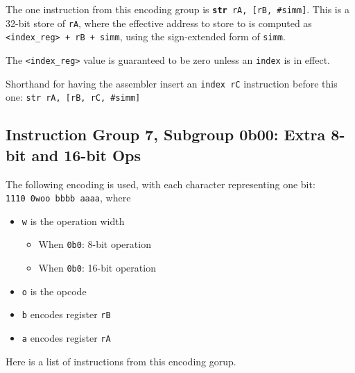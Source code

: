 \documentclass{article}
\begin{document}
	The one instruction from this encoding group is
	\texttt{\textbf{str} rA, [rB, \#simm]}.
	This is a 32-bit store of \texttt{rA}, where the effective address to
	store to is computed as \texttt{<index\_reg> + rB + simm}, using the
	sign-extended form of \texttt{simm}.

	The \texttt{<index\_reg>} value is guaranteed to be zero unless an
	\texttt{index} is in effect.

	Shorthand for having the assembler insert an \texttt{index rC}
	instruction before this one: \texttt{str rA, [rB, rC, \#simm]}


	\doublespacing

	\subsection{Instruction Group 7, Subgroup 0b00:
		Extra 8-bit and 16-bit Ops}
	The following encoding is used, with each character representing one
	bit: \\
	\texttt{1110 0woo bbbb aaaa}, where

	\singlespacing
	\begin{itemize}
	\item \texttt{w} is the operation width
		\begin{itemize}
		\item When \texttt{0b0}:
			8-bit operation
		\item When \texttt{0b0}:
			16-bit operation
		\end{itemize}
	\item \texttt{o} is the opcode
	\item \texttt{b} encodes register \texttt{rB}
	\item \texttt{a} encodes register \texttt{rA}
	\end{itemize}
	\doublespacing

	Here is a list of instructions from this encoding gorup.
\end{document}
